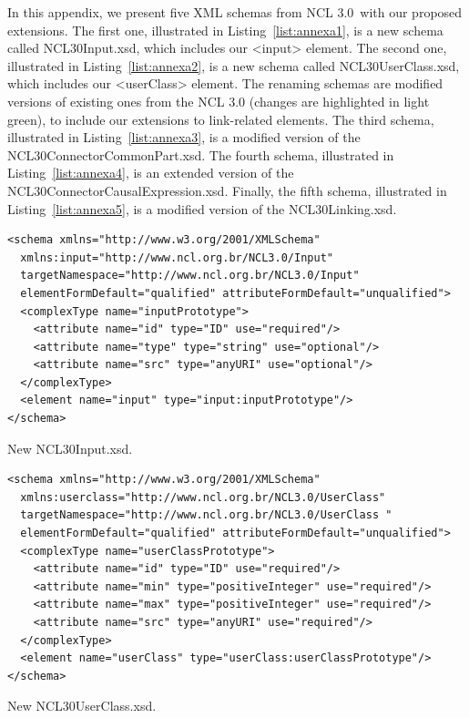 \documentclass[
  doutorado,
  american
]{ThesisPUC}
\newcommand{\lis}[1]{Listing~\ref{#1}}
\begin{document}
In this appendix, we present five XML schemas from NCL 3.0\footnotemark~with 
our proposed extensions. The first one, illustrated in \lis{list:annexa1}, is a 
new schema  called NCL30Input.xsd, which includes our <input> element. The 
second one,  illustrated in \lis{list:annexa2}, is a new schema called 
NCL30UserClass.xsd,  which  includes our <userClass> element. The renaming 
schemas are modified  versions of existing ones from the NCL 3.0 (changes are 
highlighted in light  green), to include our extensions to link-related 
elements. The third schema, illustrated in \lis{list:annexa3}, is a modified 
version of the NCL30ConnectorCommonPart.xsd. The fourth schema, illustrated in 
\lis{list:annexa4}, is an extended version of 
the NCL30ConnectorCausalExpression.xsd. Finally, the fifth schema, illustrated 
in \lis{list:annexa5}, is a modified version of the NCL30Linking.xsd.



\begin{listing}[!ht]
\begin{verbatim}
<schema xmlns="http://www.w3.org/2001/XMLSchema"
  xmlns:input="http://www.ncl.org.br/NCL3.0/Input"
  targetNamespace="http://www.ncl.org.br/NCL3.0/Input"
  elementFormDefault="qualified" attributeFormDefault="unqualified">
  <complexType name="inputPrototype">
    <attribute name="id" type="ID" use="required"/>
    <attribute name="type" type="string" use="optional"/>
    <attribute name="src" type="anyURI" use="optional"/>
  </complexType>
  <element name="input" type="input:inputPrototype"/>
</schema>
\end{verbatim}
\caption{New NCL30Input.xsd.}
\label{list:annexa1}
\end{listing}

\begin{listing}[!ht]
\begin{verbatim}
<schema xmlns="http://www.w3.org/2001/XMLSchema"
  xmlns:userclass="http://www.ncl.org.br/NCL3.0/UserClass"
  targetNamespace="http://www.ncl.org.br/NCL3.0/UserClass "
  elementFormDefault="qualified" attributeFormDefault="unqualified">
  <complexType name="userClassPrototype">
    <attribute name="id" type="ID" use="required"/>
    <attribute name="min" type="positiveInteger" use="required"/>
    <attribute name="max" type="positiveInteger" use="required"/>
    <attribute name="src" type="anyURI" use="required"/>
  </complexType>
  <element name="userClass" type="userClass:userClassPrototype"/>
</schema>
\end{verbatim}
\caption{New NCL30UserClass.xsd.}
\label{list:annexa2}
\end{listing}
\end{document}
